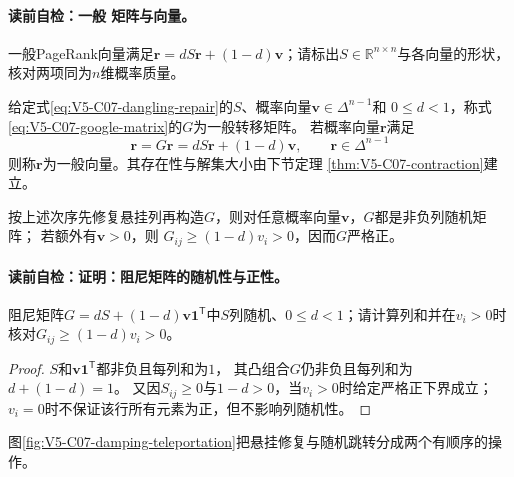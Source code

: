 \paragraph{读前自检：一般 矩阵与向量。}一般PageRank向量满足$\boldsymbol r=dS\boldsymbol r+(1-d)\boldsymbol v$；请标出$S\in\mathbb R^{n\times n}$与各向量的形状，核对两项同为$n$维概率质量。\par

\begin{definition}\label{def:V5-C07-google}
给定式\eqref{eq:V5-C07-dangling-repair}的$S$、概率向量$\boldsymbol v\in\Delta^{n-1}$和
$0\le d<1$，称式\eqref{eq:V5-C07-google-matrix}的$G$为一般\PageRank{}转移矩阵。
若概率向量$\boldsymbol r$满足
\begin{equation}
\boldsymbol r=G\boldsymbol r
=dS\boldsymbol r+(1-d)\boldsymbol v,\qquad
\boldsymbol r\in\Delta^{n-1}
\label{eq:V5-C07-general-fixed}
\end{equation}
则称$\boldsymbol r$为一般\PageRank{}向量。其存在性与解集大小由下节定理
\ref{thm:V5-C07-contraction}建立。
\end{definition}

\begin{proposition}[阻尼矩阵的随机性与正性]\label{prop:V5-C07-google-positive}
按上述次序先修复悬挂列再构造$G$，则对任意概率向量$\boldsymbol v$，$G$都是非负列随机矩阵；
若额外有$\boldsymbol v>0$，则
$G_{ij}\ge(1-d)v_i>0$，因而$G$严格正。
\end{proposition}
\paragraph{读前自检：证明：阻尼矩阵的随机性与正性。}阻尼矩阵$G=dS+(1-d)\boldsymbol v\boldsymbol1^{\mathsf T}$中$S$列随机、$0\le d<1$；请计算列和并在$v_i>0$时核对$G_{ij}\ge(1-d)v_i>0$。\par

\begin{proof}
$S$和$\boldsymbol v\boldsymbol1^{\mathsf T}$都非负且每列和为$1$，
其凸组合$G$仍非负且每列和为$d+(1-d)=1$。
又因$S_{ij}\ge0$与$1-d>0$，当$v_i>0$时给定严格正下界成立；
$v_i=0$时不保证该行所有元素为正，但不影响列随机性。
\end{proof}
图\ref{fig:V5-C07-damping-teleportation}把悬挂修复与随机跳转分成两个有顺序的操作。




